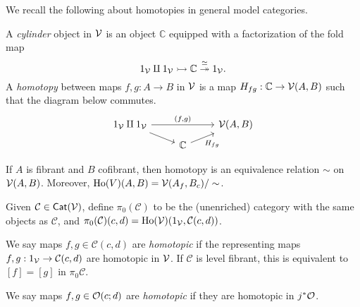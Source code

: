\documentclass[a4paper,10pt
,draft
]{article}%
\renewcommand{\1}{\ensuremath{\mathbb{id}}}
\begin{document}
{\color{OliveGreen}
We recall the following about homotopies in general model categories.
\begin{definition}
      A \textit{cylinder} object in $\mathcal V$ is an object $\mathbb C$ equipped with a factorization of the fold map
      \begin{equation}
            1_{\mathcal V} \amalg 1_{\mathcal V} \rightarrowtail \mathbb C \overset{\simeq}{\twoheadrightarrow} 1_{\mathcal V}.
      \end{equation}
      A \textit{homotopy} between maps $f,g: A \to B$ in $\mathcal V$ is a map $H_{fg}: \mathbb C \to \mathcal V(A,B)$ such that
      the diagram below commutes.
      \begin{equation}
            \begin{tikzcd}[row sep = tiny]
                  1_\V \amalg 1_\V \arrow[rr, "{(f,g)}"] \arrow[dr]
                  &&
                  \V(A,B)
                  \\
                  &
                  \mathbb C \arrow[ur, "H_{fg}"']
            \end{tikzcd}
      \end{equation}
\end{definition}

\begin{proposition}       
      If $A$ is fibrant and $B$ cofibrant, then
      homotopy is an equivalence relation $\sim$ on $\mathcal V(A,B)$.
      Moreover, 
      $\operatorname{Ho}(V)(A,B) = \mathcal V(A_f, B_c)/\sim$.
\end{proposition}

\begin{definition}
      {\color{black}Given $\mathcal C \in \mathsf{Cat}(\mathcal V)$, define $\pi_0(\mathcal C)$ to be the (unenriched) category with
      the same objects as $\mathcal C$, and $\pi_0(\mathcal C)(c,d) = \operatorname{Ho}(\mathcal V)(1_{\mathcal V}, \mathcal C(c,d))$.}

      We say maps $f,g \in \mathcal C(c,d)$ are \textit{homotopic}
      if the representing maps $f,g: 1_{\mathcal V} \to \mathcal C(c,d)$ are homotopic in $\mathcal V$.
      If $\mathcal C$ is level fibrant, this is equivalent to $[f] = [g]$ in $\pi_0\mathcal C$.

      We say maps $f,g \in \mathcal{O}(c;d)$ are \textit{homotopic} if they are homotopic in $j^{\**}\O$. 
\end{definition}

}
\end{document}
